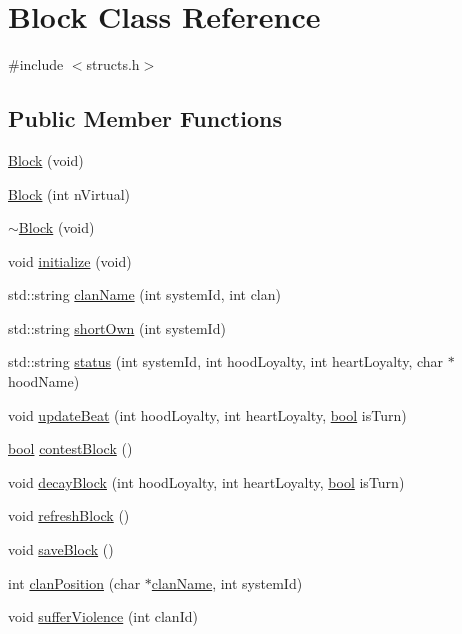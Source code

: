 \hypertarget{classBlock}{\section{Block Class Reference}
\label{classBlock}
}


{\ttfamily \#include $<$structs.\-h$>$}

\subsection*{Public Member Functions}
\begin{DoxyCompactItemize}
\item 
\hyperlink{classBlock_aaaf9bb7522544e166bbe22c762f1cd2e}{Block} (void)
\item 
\hyperlink{classBlock_a86fa6c69e85d6d72a39c2bede6e283a6}{Block} (int n\-Virtual)
\item 
\hyperlink{classBlock_a3fb080c59a4a608bfe919a713060f7ec}{$\sim$\-Block} (void)
\item 
void \hyperlink{classBlock_a4ce7c14cd53f4bd28d88c49e818efac6}{initialize} (void)
\item 
std\-::string \hyperlink{classBlock_a2007116298de0c700f37a14096569816}{clan\-Name} (int system\-Id, int clan)
\item 
std\-::string \hyperlink{classBlock_a9223f4b110b49f645fed119f4f25e48e}{short\-Own} (int system\-Id)
\item 
std\-::string \hyperlink{classBlock_abcb33df5c14f06df6a16b6ee5a337bdd}{status} (int system\-Id, int hood\-Loyalty, int heart\-Loyalty, char $\ast$hood\-Name)
\item 
void \hyperlink{classBlock_a1fb255ff20b8b4ad71daf96fe8434c0d}{update\-Beat} (int hood\-Loyalty, int heart\-Loyalty, \hyperlink{structs_8h_ad5c9d4ba3dc37783a528b0925dc981a0}{bool} is\-Turn)
\item 
\hyperlink{structs_8h_ad5c9d4ba3dc37783a528b0925dc981a0}{bool} \hyperlink{classBlock_acd93660e205566d69a0a43987944a3b5}{contest\-Block} ()
\item 
void \hyperlink{classBlock_acacdd9c24b1e8725f6e88eddd5d4384a}{decay\-Block} (int hood\-Loyalty, int heart\-Loyalty, \hyperlink{structs_8h_ad5c9d4ba3dc37783a528b0925dc981a0}{bool} is\-Turn)
\item 
void \hyperlink{classBlock_ad852050bf8d0b0a45606c7c81eff5e01}{refresh\-Block} ()
\item 
void \hyperlink{classBlock_a76ab5cc26d168222de57266857087f3f}{save\-Block} ()
\item 
int \hyperlink{classBlock_ad4f51b15f69ffe16d79a37eba197f487}{clan\-Position} (char $\ast$\hyperlink{classBlock_a2007116298de0c700f37a14096569816}{clan\-Name}, int system\-Id)
\item 
void \hyperlink{classBlock_ae1b293eaf069756ceb86282c7d3a3715}{suffer\-Violence} (int clan\-Id)
\end{DoxyCompactItemize}

